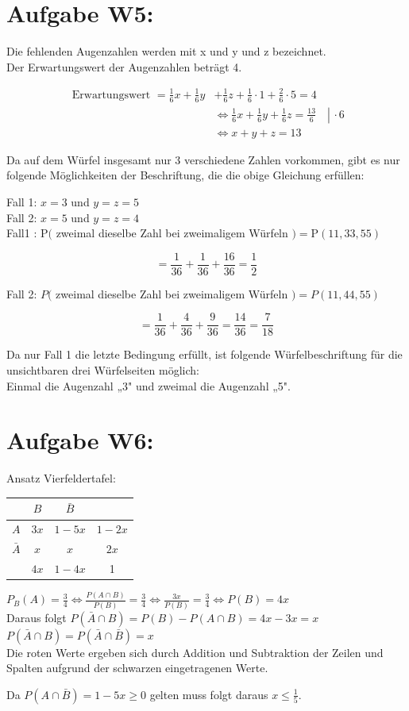 \documentclass[10pt]{article}
\begin{document}
\section*{Aufgabe W5:}
Die fehlenden Augenzahlen werden mit x und y und z bezeichnet.\\
Der Erwartungswert der Augenzahlen beträgt 4.

$$
\begin{aligned}
\text { Erwartungswert }=\frac{1}{6} x+\frac{1}{6} y & +\frac{1}{6} z+\frac{1}{6} \cdot 1+\frac{2}{6} \cdot 5=4 \\
& \left.\Leftrightarrow \frac{1}{6} x+\frac{1}{6} y+\frac{1}{6} z=\frac{13}{6} \quad \right\rvert\, \cdot 6 \\
& \Leftrightarrow x+y+z=13
\end{aligned}
$$

Da auf dem Würfel insgesamt nur 3 verschiedene Zahlen vorkommen, gibt es nur folgende Möglichkeiten der Beschriftung, die die obige Gleichung erfüllen:

Fall 1: $x=3$ und $y=z=5$\\
Fall 2: $x=5$ und $y=z=4$\\
Fall1 : $\mathrm{P}($ zweimal dieselbe Zahl bei zweimaligem Würfeln $)=\mathrm{P}(11,33,55)$

$$
=\frac{1}{36}+\frac{1}{36}+\frac{16}{36}=\frac{1}{2}
$$

Fall 2: $P($ zweimal dieselbe Zahl bei zweimaligem Würfeln $)=P(11,44,55)$

$$
=\frac{1}{36}+\frac{4}{36}+\frac{9}{36}=\frac{14}{36}=\frac{7}{18}
$$

Da nur Fall 1 die letzte Bedingung erfüllt, ist folgende Würfelbeschriftung für die unsichtbaren drei Würfelseiten möglich:\\
Einmal die Augenzahl „3" und zweimal die Augenzahl „5".

\section*{Aufgabe W6:}
Ansatz Vierfeldertafel:

\begin{center}
\begin{tabular}{|c|c|c|c|}
\hline
 & $B$ & $\bar{B}$ &  \\
\hline
$A$ & $3 x$ & $1-5 x$ & $1-2 x$ \\
\hline
$\bar{A}$ & $x$ & $x$ & $2 x$ \\
\hline
 & $4 x$ & $1-4 x$ & 1 \\
\hline
\end{tabular}
\end{center}

$P_{B}(A)=\frac{3}{4} \Leftrightarrow \frac{P(A \cap B)}{P(B)}=\frac{3}{4} \Leftrightarrow \frac{3 x}{P(B)}=\frac{3}{4} \Leftrightarrow P(B)=4 x$\\
Daraus folgt $P(\bar{A} \cap B)=P(B)-P(A \cap B)=4 x-3 x=x$\\
$P(\bar{A} \cap B)=P(\bar{A} \cap \bar{B})=x$\\
Die roten Werte ergeben sich durch Addition und Subtraktion der Zeilen und Spalten aufgrund der schwarzen eingetragenen Werte.

Da $P(A \cap \bar{B})=1-5 x \geq 0$ gelten muss folgt daraus $x \leq \frac{1}{5}$.
\end{document}
